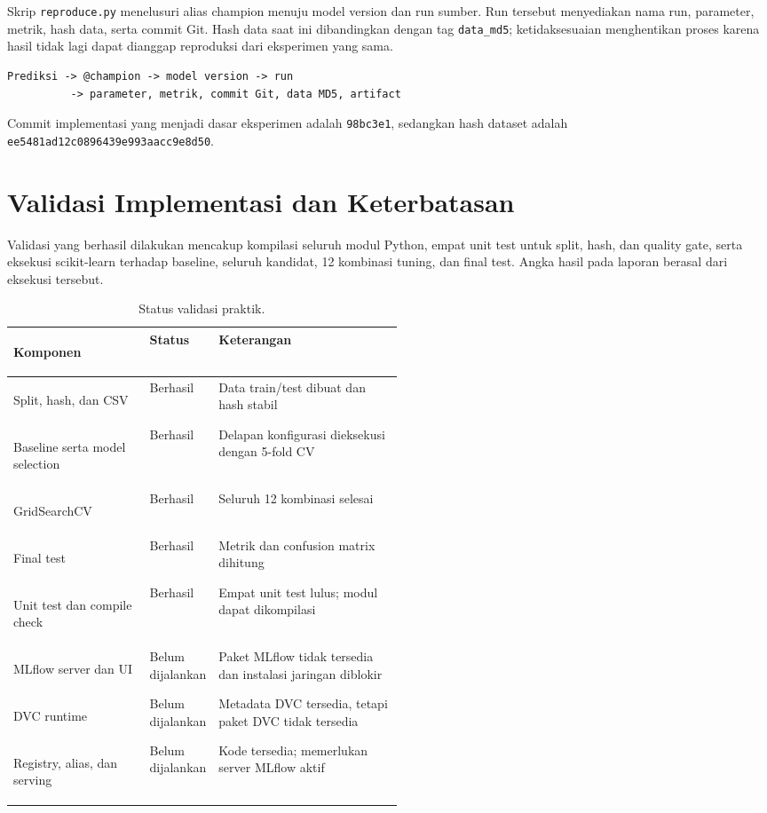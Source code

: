 \documentclass[11pt,a4paper]{article}
\begin{document}
Skrip \texttt{reproduce.py} menelusuri alias champion menuju model version dan run sumber. Run tersebut menyediakan nama run, parameter, metrik, hash data, serta commit Git. Hash data saat ini dibandingkan dengan tag \texttt{data\_md5}; ketidaksesuaian menghentikan proses karena hasil tidak lagi dapat dianggap reproduksi dari eksperimen yang sama.

\begin{lstlisting}[style=terminal]
Prediksi -> @champion -> model version -> run
          -> parameter, metrik, commit Git, data MD5, artifact
\end{lstlisting}

Commit implementasi yang menjadi dasar eksperimen adalah \texttt{98bc3e1}, sedangkan hash dataset adalah \texttt{ee5481ad12c0896439e993aacc9e8d50}.

\section{Validasi Implementasi dan Keterbatasan}

Validasi yang berhasil dilakukan mencakup kompilasi seluruh modul Python, empat unit test untuk split, hash, dan quality gate, serta eksekusi scikit-learn terhadap baseline, seluruh kandidat, 12 kombinasi tuning, dan final test. Angka hasil pada laporan berasal dari eksekusi tersebut.

\begin{table}[ht]
\centering
\caption{Status validasi praktik.}
\begin{tabularx}{\linewidth}{>{\bfseries\raggedright\arraybackslash}p{0.35\linewidth}>{\raggedright\arraybackslash}p{0.16\linewidth}>{\raggedright\arraybackslash}X}
\toprule
Komponen & Status & Keterangan \\
\midrule
Split, hash, dan CSV & Berhasil & Data train/test dibuat dan hash stabil \\
Baseline serta model selection & Berhasil & Delapan konfigurasi dieksekusi dengan 5-fold CV \\
GridSearchCV & Berhasil & Seluruh 12 kombinasi selesai \\
Final test & Berhasil & Metrik dan confusion matrix dihitung \\
Unit test dan compile check & Berhasil & Empat unit test lulus; modul dapat dikompilasi \\
MLflow server dan UI & Belum dijalankan & Paket MLflow tidak tersedia dan instalasi jaringan diblokir \\
DVC runtime & Belum dijalankan & Metadata DVC tersedia, tetapi paket DVC tidak tersedia \\
Registry, alias, dan serving & Belum dijalankan & Kode tersedia; memerlukan server MLflow aktif \\
\bottomrule
\end{tabularx}
\end{table}
\end{document}
